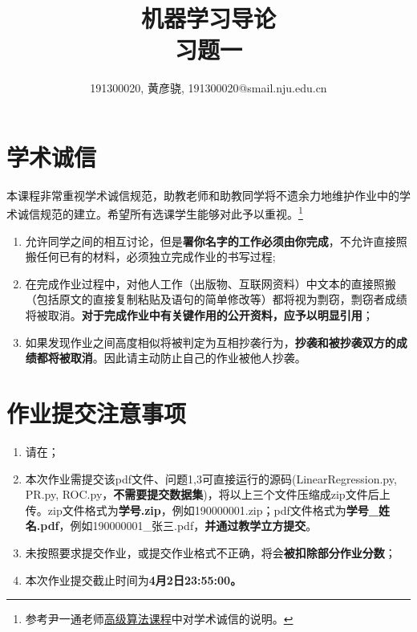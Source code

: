 \documentclass[a4paper,UTF8]{article}
\theoremstyle{definition}
\begin{document}
\title{机器学习导论\\
	习题一}
\author{191300020, 黄彦骁, 191300020@smail.nju.edu.cn}
\maketitle


\section*{学术诚信}

本课程非常重视学术诚信规范，助教老师和助教同学将不遗余力地维护作业中的学术诚信规范的建立。希望所有选课学生能够对此予以重视。\footnote{参考尹一通老师\href{http://tcs.nju.edu.cn/wiki/}{高级算法课程}中对学术诚信的说明。}

\begin{tcolorbox}
	\begin{enumerate}
		\item[(1)] 允许同学之间的相互讨论，但是{\color{red}\textbf{署你名字的工作必须由你完成}}，不允许直接照搬任何已有的材料，必须独立完成作业的书写过程;
		\item[(2)] 在完成作业过程中，对他人工作（出版物、互联网资料）中文本的直接照搬（包括原文的直接复制粘贴及语句的简单修改等）都将视为剽窃，剽窃者成绩将被取消。{\color{red}\textbf{对于完成作业中有关键作用的公开资料，应予以明显引用}}；
		\item[(3)] 如果发现作业之间高度相似将被判定为互相抄袭行为，{\color{red}\textbf{抄袭和被抄袭双方的成绩都将被取消}}。因此请主动防止自己的作业被他人抄袭。
	\end{enumerate}
\end{tcolorbox}

\section*{作业提交注意事项}
\begin{tcolorbox}
	\begin{enumerate}
		\item[(1)] 请在；
		\item[(2)] 本次作业需提交该pdf文件、问题1,3可直接运行的源码(LinearRegression.py, PR.py, ROC.py，{\color{red}\textbf{不需要提交数据集}})，将以上三个文件压缩成zip文件后上传。zip文件格式为{\color{red}\textbf{学号.zip}}，例如190000001.zip；pdf文件格式为{\color{red}\textbf{学号\_姓名.pdf}}，例如190000001\_张三.pdf，{\color{red}\textbf{并通过教学立方提交}}。
		\item[(3)] 未按照要求提交作业，或提交作业格式不正确，将会{\color{red}\textbf{被扣除部分作业分数}}；
		\item[(4)] 本次作业提交截止时间为{\color{red}\textbf{4月2日23:55:00。}}
	\end{enumerate}
\end{tcolorbox}
\end{document}
